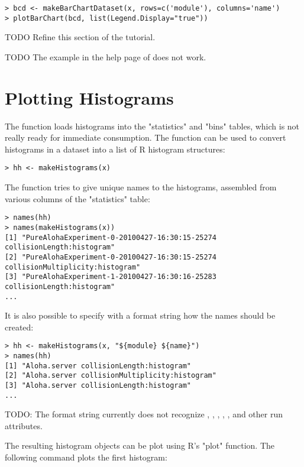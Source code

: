 \begin{verbatim}
> bcd <- makeBarChartDataset(x, rows=c('module'), columns='name')
> plotBarChart(bcd, list(Legend.Display="true"))
\end{verbatim}

TODO Refine this section of the tutorial.

TODO The example in the help page of  does not work.


\section{Plotting Histograms}

The  function loads histograms into the "statistics" and "bins" tables,
which is not really ready for immediate consumption. The  function
can be used to convert histograms in a dataset into a list of R histogram structures:

\begin{verbatim}
> hh <- makeHistograms(x)
\end{verbatim}

The function tries to give unique names to the histograms, assembled from various columns
of the "statistics" table:

\begin{verbatim}
> names(hh)
> names(makeHistograms(x))
[1] "PureAlohaExperiment-0-20100427-16:30:15-25274 collisionLength:histogram"
[2] "PureAlohaExperiment-0-20100427-16:30:15-25274 collisionMultiplicity:histogram"
[3] "PureAlohaExperiment-1-20100427-16:30:16-25283 collisionLength:histogram"
...
\end{verbatim}

It is also possible to specify with a format string how the names should be created:

\begin{verbatim}
> hh <- makeHistograms(x, "${module} ${name}")
> names(hh)
[1] "Aloha.server collisionLength:histogram"      
[2] "Aloha.server collisionMultiplicity:histogram"
[3] "Aloha.server collisionLength:histogram"      
...
\end{verbatim}

TODO: The format string currently does not recognize , 
, , ,
,  and other run attributes.

The resulting histogram objects can be plot using R's "plot" function. The
following command plots the first histogram:

